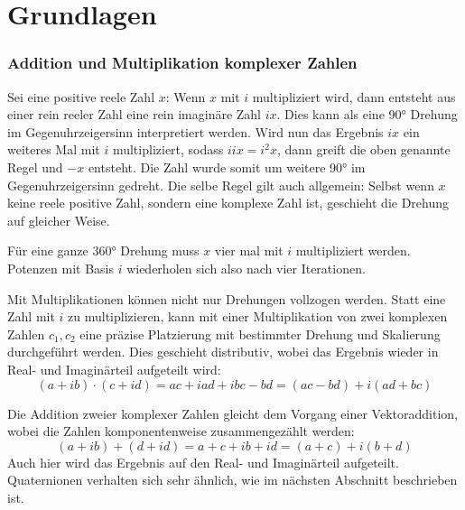 %
%
%
%

\section{Grundlagen\label{qa:section:einleitung}}
\subsubsection{Addition und Multiplikation komplexer Zahlen}
Sei eine positive reele Zahl $x$: Wenn $x$ mit $i$ multipliziert 
wird, dann entsteht aus einer rein reeler Zahl eine rein imaginäre 
Zahl $ix$. Dies kann als eine 90° Drehung im Gegenuhrzeigersinn 
interpretiert werden. Wird nun das Ergebnis $ix$ ein weiteres Mal 
mit $i$ multipliziert, sodass $iix = i^2x$, dann greift die oben 
genannte Regel und $-x$ entsteht. Die Zahl wurde somit um weitere 
90° im Gegenuhrzeigersinn gedreht. Die selbe Regel gilt auch 
allgemein: Selbst wenn $x$ keine reele positive Zahl, sondern eine 
komplexe Zahl ist, geschieht die Drehung auf gleicher Weise. 

Für eine ganze 360° Drehung muss $x$ vier mal mit $i$ multipliziert 
werden. Potenzen mit Basis $i$ wiederholen sich also nach vier 
Iterationen.


Mit Multiplikationen können nicht nur Drehungen vollzogen werden. 
Statt eine Zahl mit $i$ zu multiplizieren, kann mit einer 
Multiplikation von zwei komplexen Zahlen $c_1, c_2$ eine präzise 
Platzierung mit bestimmter Drehung und Skalierung durchgeführt 
werden. Dies geschieht distributiv, wobei das Ergebnis wieder in 
Real- und Imaginärteil aufgeteilt wird:
\begin{equation*}
    (a + ib) \cdot (c + id) 
    = ac + iad + ibc - bd = 
    (ac - bd) + i(ad + bc)
\end{equation*}

Die Addition zweier komplexer Zahlen gleicht dem Vorgang einer 
Vektoraddition, wobei die Zahlen komponentenweise zusammengezählt   
werden:
\begin{equation*}
    (a + ib) + (d + id) = a+c + ib + id = (a+c) + i(b+d)
\end{equation*}
Auch hier wird das Ergebnis auf den Real- und Imaginärteil 
aufgeteilt. Quaternionen verhalten sich sehr ähnlich, wie im 
nächsten Abschnitt beschrieben ist.

